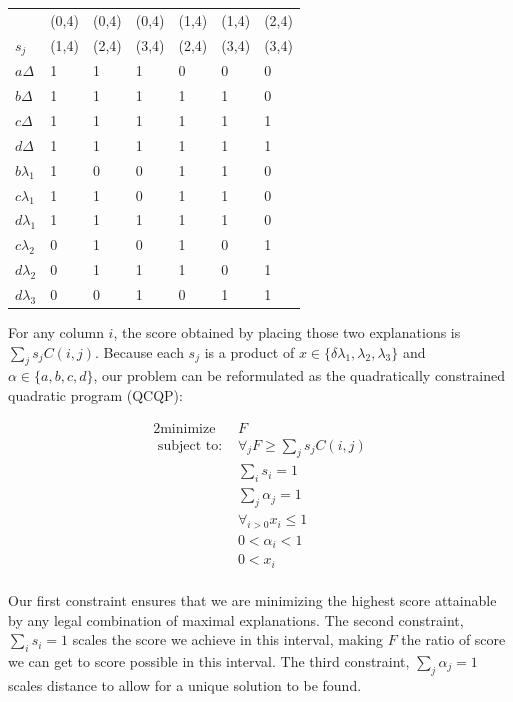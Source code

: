 \begin{tabular}{l|llllll}
      & (0,4) & (0,4) & (0,4) & (1,4) & (1,4) & (2,4) \\
$s_j$ & (1,4) & (2,4) & (3,4) & (2,4) & (3,4) & (3,4) \\ \hline
$a\Delta$ & 1 & 1 & 1 & 0 & 0 & 0 \\
$b\Delta$ & 1 & 1 & 1 & 1 & 1 & 0 \\
$c\Delta$ & 1 & 1 & 1 & 1 & 1 & 1 \\
$d\Delta$ & 1 & 1 & 1 & 1 & 1 & 1 \\
$b \lambda_1$ & 1 & 0 & 0 & 1 & 1 & 0 \\
$c \lambda_1$ & 1 & 1 & 0 & 1 & 1 & 0\\
$d \lambda_1$ & 1 & 1 & 1 & 1 & 1 & 0 \\
$c \lambda_2$ & 0 & 1 & 0 & 1 & 0 & 1\\
$d \lambda_2$ & 0 & 1 & 1 & 1 & 0 & 1\\
$d \lambda_3$ & 0 & 0 & 1 & 0 & 1 & 1\\
\end{tabular}

For any column $i$, the score obtained by placing those two explanations is $\sum_j s_j C(i,j)$.  Because each $s_j$ is a product of $x \in \{ \delta \lambda_1, \lambda_2, \lambda_3 \}$ and $\alpha \in \{ a, b, c, d \}$, our problem can be reformulated as the quadratically constrained quadratic program (QCQP):

\begin{alignat*}{2}
  \text{minimize } & F \\
  \text{ subject to: } & \forall_j F \geq \sum_j s_j C(i,j) \\
                        & \sum_i s_i = 1 \\
                        & \sum_j \alpha_j = 1 \\
                        & \forall_{i>0} x_i \leq 1 \\
                        & 0 < \alpha_i < 1 \\
                        & 0 < x_i \\
\end{alignat*}

Our first constraint ensures that we are minimizing the highest score attainable by any legal combination of maximal explanations. The second constraint, $\sum_i s_i = 1$ scales the score we achieve in this interval, making $F$ the ratio of score we can get to score possible in this interval. The third constraint, $\sum_j \alpha_j = 1$ scales distance to allow for a unique solution to be found.  

